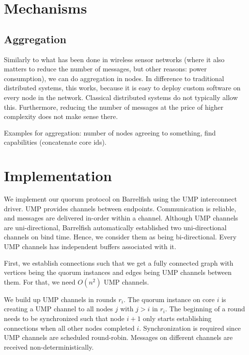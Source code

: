 \documentclass{article}
\begin{document}
\section{Mechanisms}

\subsection{Aggregation}

Similarly to what has been done in wireless sensor networks (where it
also matters to reduce the number of messages, but other reasons:
power consumption), we can do aggregation in nodes. In difference to
traditional distributed systems, this works, because it is easy to
deploy custom software on every node in the network. Classical
distributed systems do not typically allow this. Furthermore, reducing
the number of messages at the price of higher complexity does not make
sense there.

Examples for aggregation: number of nodes agreeing to something, find
capabilities (concatenate core ids). 

\section{Implementation}

We implement our quorum protocol on Barrelfish using the UMP
interconnect driver. UMP provides channels between
endpoints. Communication is reliable, and messages are delivered
in-order within a channel. Although UMP channels are uni-directional,
Barrelfish automatically established two uni-directional channels on
bind time. Hence, we consider them as being bi-directional. Every UMP
channels has independent buffers associated with it.

First, we establish connections such that we get a fully connected
graph with vertices being the quorum instances and edges being UMP
channels between them. For that, we need $O(n^2)$ UMP channels. 

We build up UMP channels in rounds $r_i$. The quorum instance on core
$i$ is creating a UMP channel to all nodes $j$ with $j>i$ in
$r_i$. The beginning of a round needs to be synchronized such that
node $i+1$ only starts establishing connections when all other nodes
completed $i$. Synchronization is required since UMP channels are
scheduled round-robin. Messages on different channels are received
non-deterministically. 
\end{document}
